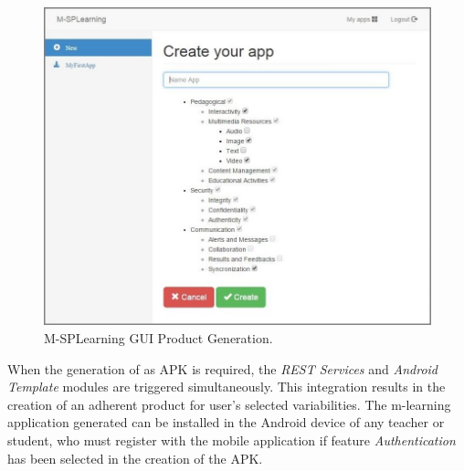 
\begin{figure}
\centering
\includegraphics[scale=0.4]{figures/section3/MSPLWebGeneration}
\caption{M-SPLear\allowbreak ning GUI Product Generation.}
\label{figureMSPLWebGeneration}
\end{figure}

When the generation of as APK is required, the \textit{REST Services} and \textit{Android Template} modules are triggered simultaneously. This integration results in the creation of an adherent product for user's selected variabilities. The m-learning application generated can be installed in the Android device of any teacher or student, who must register with the mobile application if feature \textit{Authentication} has been selected in the creation of the APK.

